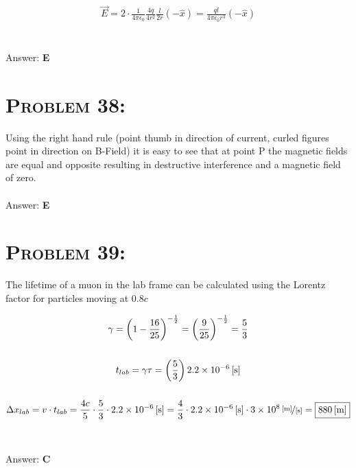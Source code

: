 \documentclass{article}
\providecommand{\e}[1]{\ensuremath{\times 10^{#1}}}
\begin{document}
\begin{align}
\vec{E} = 2 \cdot \frac{1}{4 \pi \epsilon_{0}} \frac{4q}{4r^{2}} \frac{l}{{2r}}(-\hat{x}) = \boxed {\frac{ql}{4 \pi \epsilon_{0} r^3}(-\hat{x})}\nonumber
\end{align}
\\\\
Answer: \textbf{\textcolor{ProcessBlue}E}\\


\section{\textsc{Problem 38:}} Using the right hand rule (point thumb in direction of current, curled figures point in direction on B-Field) it is easy to see that at point P the magnetic fields are equal and opposite resulting in destructive interference and a magnetic field of zero.
\\\\
Answer: \textbf{\textcolor{ProcessBlue}E}\\


\section{\textsc{Problem 39:}} The lifetime of a muon in the lab frame can be calculated using the Lorentz factor for particles moving at $0.8c$

\begin{gather}
\gamma = \left(1- \frac{16}{25} \right)^{-\frac{1}{2}} = \left(\frac{9}{25}\right)^{-\frac{1}{2}} = \frac{5}{3}\nonumber\\
\nonumber\\
t_{lab} = \gamma \tau = \left(\frac{5}{3}\right)\unit[2.2\e{-6}]{[s]} \nonumber\\
\nonumber\\
\Delta x_{lab} = v \cdot t_{lab} = \frac{4 c}{5}\cdot \frac{5}{3}\cdot\unit[2.2\e{-6}]{[s]} = \frac{4}{3}\cdot\unit[2.2\e{-6}]{[s]} \cdot \unitfrac[3\e{8}]{[m]}{[s]} = \boxed{\unit[880]{[m]}} \nonumber
\end{gather}
\\\\
Answer: \textbf{\textcolor{ProcessBlue}C}\\

\end{document}
